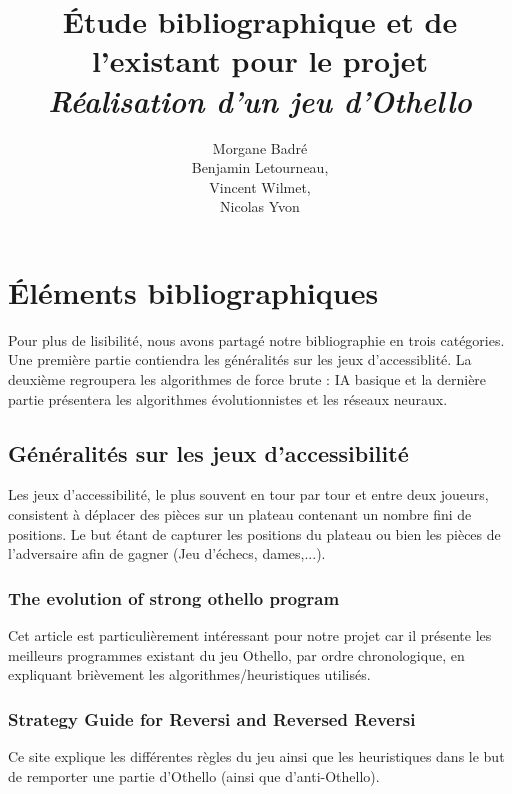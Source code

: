 \documentclass[a4paper,12pt]{article}
\begin{document}
\title{Étude bibliographique et de l'existant pour le projet\\
  \textit{Réalisation d'un jeu d'Othello}}

\author{Morgane Badré\\
   Benjamin Letourneau,\\
   Vincent Wilmet,\\
   Nicolas Yvon\\}
 \date{}

\maketitle

\section{Éléments bibliographiques} 

\nocite{*}

Pour plus de lisibilité, nous avons partagé notre bibliographie en trois catégories. Une première partie contiendra les généralités sur les jeux d’accessiblité. La deuxième regroupera les algorithmes de force brute : IA basique et la dernière partie présentera les algorithmes évolutionnistes et les réseaux neuraux.


\subsection{Généralités sur les jeux d'accessibilité}

Les jeux d’accessibilité, le plus souvent en tour par tour et entre deux
joueurs, consistent à déplacer des pièces sur un plateau contenant un
nombre fini de positions. Le but étant de capturer les positions du
plateau ou bien les pièces de l'adversaire afin de gagner (Jeu d’échecs, dames,...).

\subsubsection{The evolution of strong othello program}
Cet article \cite{a} est particulièrement intéressant pour notre projet car il présente les meilleurs programmes existant du jeu Othello, par ordre chronologique, en expliquant brièvement les algorithmes/heuristiques utilisés.

\subsubsection{Strategy Guide for Reversi and Reversed Reversi}
Ce site \cite{strategy} explique les différentes règles du jeu ainsi que les heuristiques dans le but de remporter une partie d'Othello (ainsi que d'anti-Othello).
\end{document}
